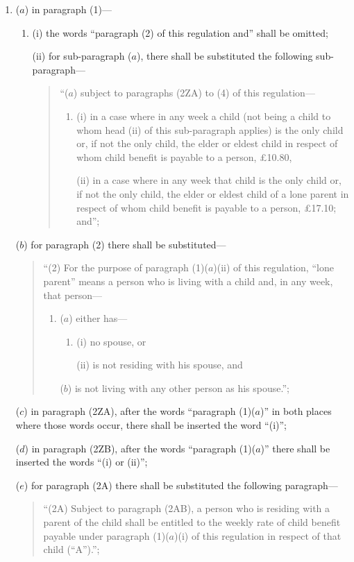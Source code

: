 \documentclass[a4paper]{article}
\begin{document}
\begin{enumerate}\item[]
($a$) in paragraph (1)—
\begin{enumerate}\item[]
(i) the words “paragraph (2) of this regulation and” shall be omitted;

(ii) for sub-paragraph ($a$), there shall be substituted the following sub-paragraph—
\begin{quotation}
“($a$) subject to paragraphs (2ZA) to (4) of this regulation—
\begin{enumerate}\item[]
(i) in a case where in any week a child (not being a child to whom head (ii) of this sub-paragraph applies) is the only child or, if not the only child, the elder or eldest child in respect of whom child benefit is payable to a person, £10.80,

(ii) in a case where in any week that child is the only child or, if not the only child, the elder or eldest child of a lone parent in respect of whom child benefit is payable to a person, £17.10; and”;
\end{enumerate}
\end{quotation}
\end{enumerate}

($b$) for paragraph (2) there shall be substituted—
\begin{quotation}
“(2) For the purpose of paragraph (1)($a$)(ii) of this regulation, “lone parent” means a person who is living with a child and, in any week, that person—
\begin{enumerate}\item[]
($a$) either has—
\begin{enumerate}\item[]
(i) no spouse, or

(ii) is not residing with his spouse, and
\end{enumerate}

($b$) is not living with any other person as his spouse.”;
\end{enumerate}
\end{quotation}

($c$) in paragraph (2ZA), after the words “paragraph (1)($a$)” in both places where those words occur, there shall be inserted the word “(i)”;

($d$) in paragraph (2ZB), after the words “paragraph (1)($a$)” there shall be inserted the words “(i) or (ii)”;

($e$) for paragraph (2A) there shall be substituted the following paragraph—
\begin{quotation}
“(2A) Subject to paragraph (2AB), a person who is residing with a parent of the child shall be entitled to the weekly rate of child benefit payable under paragraph (1)($a$)(i) of this regulation in respect of that child (“A”).”;
\end{quotation}


\end{enumerate}
\end{document}

